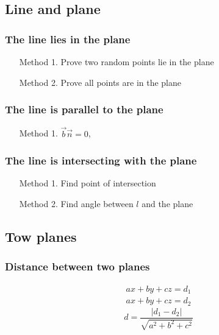 \documentclass[a4paper,9pt]{scrartcl}
\newcommand{\abs}[1]{\left| #1 \right|}
\begin{document}
    \begin{displaymath}

    \end{displaymath}

    \subsection{Line and plane}

    \subsubsection{The line lies in the plane}
    \begin{itemize}
        \item [Method 1.] Prove two random points lie in the plane
        \item [Method 2.] Prove all points are in the plane
    \end{itemize}

    \subsubsection{The line is parallel to the plane}
    \begin{itemize}
        \item [Method 1.] $\vec{b}\vec{n} = 0$,
    \end{itemize}

    \subsubsection{The line is intersecting with the plane}
    \begin{itemize}
        \item [Method 1.] Find point of intersection
        \item [Method 2.] Find angle between $l$ and the plane
    \end{itemize}

    \subsection{Tow planes}

    \subsubsection{Distance between two planes}
    \begin{align}
        ax+by+cz=d_1 \\
        ax+by+cz=d_2
    \end{align}
    \begin{displaymath}
        d = \frac{\abs{d_1 - d_2}}{\sqrt{a^2 + b^2 + c^2}}
    \end{displaymath}
\end{document}
